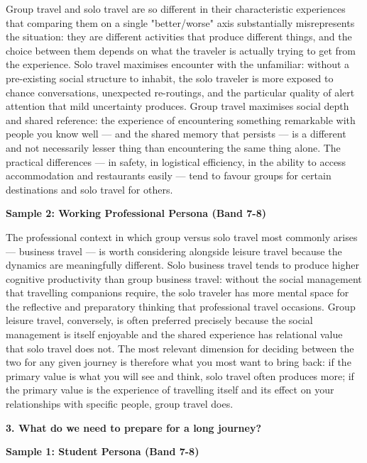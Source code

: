 Group travel and solo travel are so different in their characteristic experiences that comparing them on a single "better/worse" axis substantially misrepresents the situation: they are different activities that produce different things, and the choice between them depends on what the traveler is actually trying to get from the experience. Solo travel maximises encounter with the unfamiliar: without a pre-existing social structure to inhabit, the solo traveler is more exposed to chance conversations, unexpected re-routings, and the particular quality of alert attention that mild uncertainty produces. Group travel maximises social depth and shared reference: the experience of encountering something remarkable with people you know well — and the shared memory that persists — is a different and not necessarily lesser thing than encountering the same thing alone. The practical differences — in safety, in logistical efficiency, in the ability to access accommodation and restaurants easily — tend to favour groups for certain destinations and solo travel for others.

\textbf{Sample 2: Working Professional Persona (Band 7-8)}

The professional context in which group versus solo travel most commonly arises — business travel — is worth considering alongside leisure travel because the dynamics are meaningfully different. Solo business travel tends to produce higher cognitive productivity than group business travel: without the social management that travelling companions require, the solo traveler has more mental space for the reflective and preparatory thinking that professional travel occasions. Group leisure travel, conversely, is often preferred precisely because the social management is itself enjoyable and the shared experience has relational value that solo travel does not. The most relevant dimension for deciding between the two for any given journey is therefore what you most want to bring back: if the primary value is what you will see and think, solo travel often produces more; if the primary value is the experience of travelling itself and its effect on your relationships with specific people, group travel does.

\separator

\begin{ieltsquestion}
\textbf{3. What do we need to prepare for a long journey?}
\end{ieltsquestion}
\textbf{Sample 1: Student Persona (Band 7-8)}


